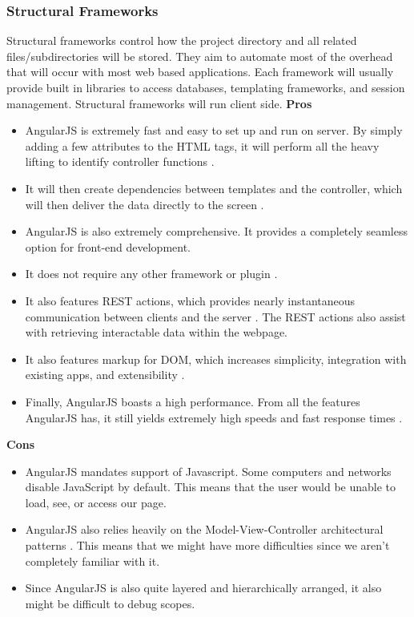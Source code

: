 \subsubsection{Structural Frameworks}
	Structural frameworks control how the project directory and all related files/subdirectories will be stored. They aim to automate most of the overhead that will occur with most web based applications. Each framework will usually provide built in libraries to access databases, templating frameworks, and session management. Structural frameworks will run client side.
	\textbf{Pros}
		\begin{itemize}
			\item AngularJS is extremely fast and easy to set up and run on server. By simply adding a few attributes to the HTML tags, it will perform all the heavy lifting to identify controller functions \cite{angularjsPC}. 
			\item It will then create dependencies between templates and the controller, which will then deliver the data directly to the screen \cite{angularjs}. 
			\item AngularJS is also extremely comprehensive. It provides a completely seamless option for front-end development. 
			\item It does not require any other framework or plugin \cite{angularjsPC}. 
			\item It also features REST actions, which provides nearly instantaneous communication between clients and the server \cite{angularjs}. The REST actions also assist with retrieving interactable data within the webpage. 
			\item It also features markup for DOM, which increases simplicity, integration with existing apps, and extensibility \cite{angularjs}. 
			\item Finally, AngularJS boasts a high performance. From all the features AngularJS has, it still yields extremely high speeds and fast response times \cite{angularjsPC}.
		\end{itemize}
  \textbf{Cons}
		\begin{itemize}
			\item AngularJS mandates support of Javascript. Some computers and networks disable JavaScript by default. This means that the user would be unable to load, see, or access our page. 
			\item AngularJS also relies heavily on the Model-View-Controller architectural patterns \cite{angularjsPC}. This means that we might have more difficulties since we aren't completely familiar with it. 
			\item Since AngularJS is also quite layered and hierarchically arranged, it also might be difficult to debug scopes.
		\end{itemize}
